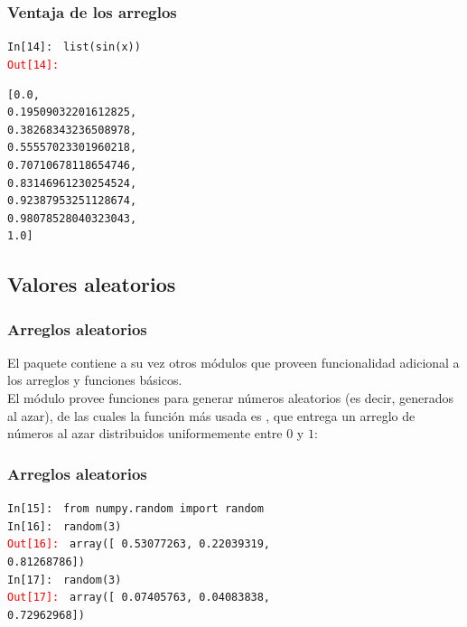 \begin{frame}[fragile]
\frametitle{Ventaja de los arreglos}
\begin{tcolorbox}[colback=aquamarine!30!white, colbacktitle=kellygreen, coltitle=white, fonttitle=\small, title=Lista de valores evaluados en la función]
\fontsize{10}{10}\selectfont
\textcolor{ao}{\texttt{In[14]: }} \texttt{list(sin(x))} \\
\pause
\textcolor{red}{\texttt{Out[14]: }}
\begin{verbatim}
[0.0,
0.19509032201612825,
0.38268343236508978,
0.55557023301960218,
0.70710678118654746,
0.83146961230254524,
0.92387953251128674,
0.98078528040323043,
1.0]
\end{verbatim}
\end{tcolorbox}
\end{frame}
\subsection{Valores aleatorios}
\begin{frame}[fragile]
\frametitle{Arreglos aleatorios}
El paquete  contiene a su vez otros módulos que proveen funcionalidad adicional a los arreglos y funciones básicos.
\\
\bigskip
El módulo  provee funciones para generar números aleatorios (es decir, generados al azar), de las cuales la función más usada es , que entrega un arreglo de números al azar distribuidos uniformemente entre $0$ y $1$:
\end{frame}
\begin{frame}[fragile]
\frametitle{Arreglos aleatorios}
\begin{tcolorbox}[colback=aquamarine!30!white, colbacktitle=kellygreen, coltitle=white, fonttitle=\small, title=Generando números aleatorios]
\fontsize{10}{10}\selectfont
\textcolor{ao}{\texttt{In[15]: }} \texttt{from numpy.random import random} \\
\medskip
\pause
\textcolor{ao}{\texttt{In[16]: }} \texttt{random(3)} \\
\medskip
\pause
\textcolor{red}{\texttt{Out[16]: }} \texttt{array([ 0.53077263,  0.22039319,} \\
\hspace*{1.3cm} \texttt{0.81268786])} \\
\pause
\textcolor{ao}{\texttt{In[17]: }} \texttt{random(3)} \\
\medskip
\pause
\textcolor{red}{\texttt{Out[17]: }} \texttt{array([ 0.07405763,  0.04083838,} \\
\hspace*{1.3cm} \texttt{0.72962968])}
\end{tcolorbox}
\end{frame}
